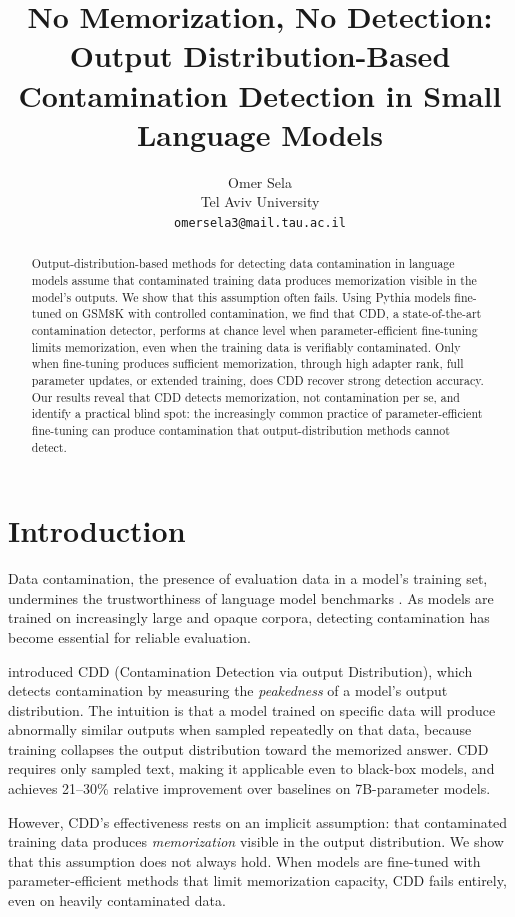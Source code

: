 \documentclass[11pt]{article}
\title{No Memorization, No Detection: Output Distribution-Based Contamination Detection in Small Language Models}
\author{Omer Sela \\
  Tel Aviv University \\
  \texttt{omersela3@mail.tau.ac.il}}
\begin{document}
\maketitle

\begin{abstract}
Output-distribution-based methods for detecting data contamination in language models assume that contaminated training data produces memorization visible in the model's outputs. We show that this assumption often fails. Using Pythia models fine-tuned on GSM8K with controlled contamination, we find that CDD, a state-of-the-art contamination detector, performs at chance level when parameter-efficient fine-tuning limits memorization, even when the training data is verifiably contaminated. Only when fine-tuning produces sufficient memorization, through high adapter rank, full parameter updates, or extended training, does CDD recover strong detection accuracy. Our results reveal that CDD detects memorization, not contamination per se, and identify a practical blind spot: the increasingly common practice of parameter-efficient fine-tuning can produce contamination that output-distribution methods cannot detect.
\end{abstract}


\section{Introduction}

Data contamination, the presence of evaluation data in a model's training set, undermines the trustworthiness of language model benchmarks \citep{magar2022data, jacovi2023stop, sainz2023nlp}. As models are trained on increasingly large and opaque corpora, detecting contamination has become essential for reliable evaluation.

\citet{dong2024contamination} introduced CDD (Contamination Detection via output Distribution), which detects contamination by measuring the \emph{peakedness} of a model's output distribution. The intuition is that a model trained on specific data will produce abnormally similar outputs when sampled repeatedly on that data, because training collapses the output distribution toward the memorized answer. CDD requires only sampled text, making it applicable even to black-box models, and achieves 21--30\% relative improvement over baselines on 7B-parameter models.

However, CDD's effectiveness rests on an implicit assumption: that contaminated training data produces \emph{memorization} visible in the output distribution. We show that this assumption does not always hold. When models are fine-tuned with parameter-efficient methods that limit memorization capacity, CDD fails entirely, even on heavily contaminated data.
\end{document}
